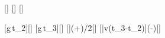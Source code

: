 [\mpss]
[\s]
[\s]

[g\,t_2]{\gEX*\tzX}[\mps]
[g\,t_3]{\gEX*\tdX}[\mps]
[]{(\vzX+\vdX)/2}[\mps]
[\bar v\cdot\left(t_3-t_2\right)]{\vmX*(\tdX-\tzX)}[\m]
